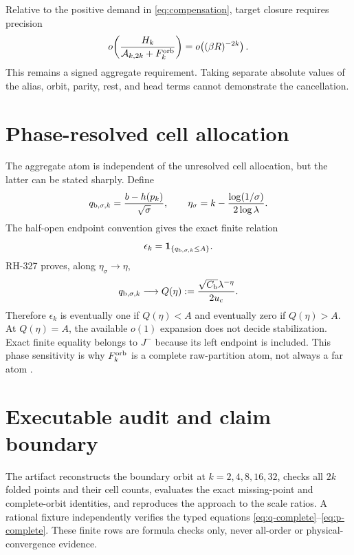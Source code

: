 \documentclass[11pt]{article}
\theoremstyle{remark}
\newcommand{\cA}{\mathcal A}
\newcommand{\one}{\mathbf 1}
\begin{document}
Relative to the positive demand in \eqref{eq:compensation}, target closure
requires precision
\begin{equation}\label{eq:precision}
 o\!\left(\frac{H_k}{\cA_{k,2k}+F_k^{\rm orb}}\right)
 =o\!\left((\beta R)^{-2k}\right).
\end{equation}
This remains a signed aggregate requirement.  Taking separate absolute
values of the alias, orbit, parity, rest, and head terms cannot demonstrate
the cancellation.

\section{Phase-resolved cell allocation}

The aggregate atom is independent of the unresolved cell allocation, but
the latter can be stated sharply.  Define
\begin{equation}\label{eq:qb}
 q_{{\rm b},\sigma,k}=\frac{b-h(p_k)}{\sqrt\sigma},\qquad
 \eta_\sigma=k-\frac{\log(1/\sigma)}{2\log\lambda}.
\end{equation}
The half-open endpoint convention gives the exact finite relation
\begin{equation}\label{eq:epsilon}
 \epsilon_k=\one_{\{q_{{\rm b},\sigma,k}\le A\}}.
\end{equation}
RH-327 proves, along $\eta_\sigma\to\eta$,
\begin{equation}\label{eq:qb-limit}
 q_{{\rm b},\sigma,k}\longrightarrow
 Q(\eta):=\frac{\sqrt{C_{\rm b}}\lambda^{-\eta}}{2u_c}.
\end{equation}
Therefore $\epsilon_k$ is eventually one if $Q(\eta)<A$ and eventually zero
if $Q(\eta)>A$.  At $Q(\eta)=A$, the available $o(1)$ expansion does not
decide stabilization.  Exact finite equality belongs to $J^-$ because its
left endpoint is included.  This phase sensitivity is why
$F_k^{\rm orb}$ is a complete raw-partition atom, not always a far atom
\citep{WangNeighboringBudget2026}.

\section{Executable audit and claim boundary}

The artifact reconstructs the boundary orbit at $k=2,4,8,16,32$, checks all
$2k$ folded points and their cell counts, evaluates the exact missing-point
and complete-orbit identities, and reproduces the approach to the scale
ratios.  A rational fixture independently verifies the typed equations
\eqref{eq:q-complete}--\eqref{eq:p-complete}.  These finite rows are formula
checks only, never all-order or physical-convergence evidence.
\end{document}

